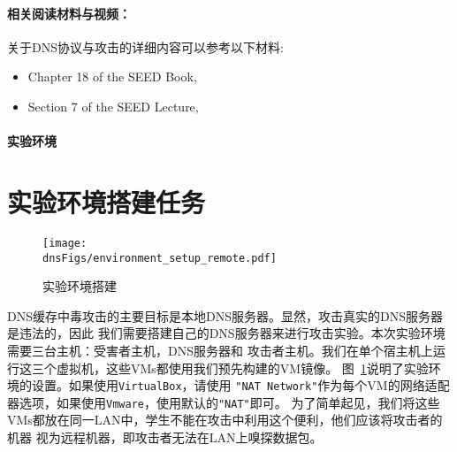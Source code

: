 \vspace{0.1in}


\paragraph{相关阅读材料与视频：}
关于DNS协议与攻击的详细内容可以参考以下材料:

\begin{itemize}
\item Chapter 18 of the SEED Book, \seedbook
\item Section 7 of the SEED Lecture, \seedisvideo
\end{itemize}


\paragraph{实验环境} \seedenvironment


\vspace{0.2in}
\noindent
{}




\section{实验环境搭建任务}
\label{sec:environment}

\begin{figure}[htb]
\centering
\texttt{[image: \\dnsFigs/environment\_setup\_remote.pdf]}
\caption{实验环境搭建}
\label{dns:fig:environment}
\end{figure}


DNS缓存中毒攻击的主要目标是本地DNS服务器。显然，攻击真实的DNS服务器是违法的，因此
我们需要搭建自己的DNS服务器来进行攻击实验。本次实验环境需要三台主机：受害者主机，DNS服务器和
攻击者主机。我们在单个宿主机上运行这三个虚拟机，这些VMs都使用我们预先构建的\ubuntu VM镜像。
图~\ref{dns:fig:environment}说明了实验环境的设置。如果使用{\tt VirtualBox}，请使用
{\tt "NAT Network"}作为每个VM的网络适配器选项，如果使用{\tt Vmware}，使用默认的{\tt "NAT"}即可。
为了简单起见，我们将这些VMs都放在同一LAN中，学生不能在攻击中利用这个便利，他们应该将攻击者的机器
视为远程机器，即攻击者无法在LAN上嗅探数据包。


